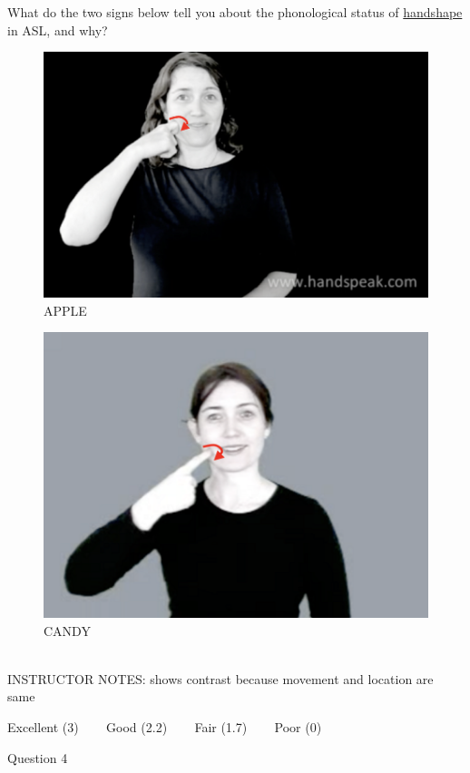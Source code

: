 \documentclass[12pt]{article}
\begin{document}
What do the two signs below tell you about the phonological status of \underline{handshape} in ASL, and why?\\

\begin{figure}[H]
\includegraphics{../images/asl_apple.png}
\caption{APPLE}
\end{figure}
\begin{figure}[H]
\includegraphics{../images/asl_candy.png}
\caption{CANDY}
\end{figure}

~\\
INSTRUCTOR NOTES: shows contrast because movement and location are same


\vfill
Excellent (3) ~~~ Good (2.2) ~~~ Fair (1.7) ~~~ Poor (0)
\newpage

{\large Question 4}\\
\end{document}
